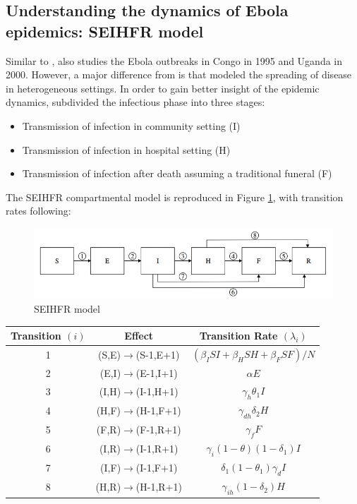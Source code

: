 \documentclass[10pt, journal,onecolumn]{IEEEtran}
\begin{document}
\subsection{\textbf{Understanding the dynamics of Ebola epidemics: SEIHFR model \citep{legrand2007understanding}}}

Similar to \citep{chowell2004basic}, \citep{legrand2007understanding} also studies the Ebola
outbreaks in Congo in 1995 and Uganda in 2000. However, a major difference from
\citep{chowell2004basic} is that \citep{legrand2007understanding} modeled the spreading of disease
in heterogeneous settings. In order to gain better insight of the epidemic dynamics,
\citep{legrand2007understanding} subdivided the infectious phase into three stages:

\begin{itemize}
\item Transmission of infection in community setting (I)
\item Transmission of infection in hospital setting (H)
\item Transmission of infection after death assuming a traditional funeral (F)
\end{itemize}


The SEIHFR compartmental model is reproduced in Figure \ref{fig:SEIHFR_model}, with transition rates
following:

\begin{figure}[h!]
\centering
\includegraphics[scale=0.5]{seihfr_model_fig}
\caption{SEIHFR model}
\label{fig:SEIHFR_model}
\end{figure}

\begin{center}
\begin{tabular}{|c|c|c|}
\hline 
Transition $(i)$ & Effect & Transition Rate $(\lambda_i)$ \tabularnewline
\hline 
\hline 
1 & (S,E)$\to$(S-1,E+1) & $(\beta_{I}SI+\beta_{H}SH+\beta_{F}SF)/N$\tabularnewline
\hline 
2 & (E,I)$\to$(E-1,I+1) & $\alpha E$\tabularnewline
\hline 
3 & (I,H)$\to$(I-1,H+1) & $\gamma_{h}\theta_{1}I$\tabularnewline
\hline 
4 & (H,F)$\to$(H-1,F+1) & $\gamma_{dh}\delta_{2}H$\tabularnewline
\hline 
5 & (F,R)$\to$(F-1,R+1) & $\gamma_{f}F$\tabularnewline
\hline 
6 & (I,R)$\to$(I-1,R+1) & $\gamma_{i}(1-\theta)(1-\delta_{1})I$\tabularnewline
\hline 
7 & (I,F)$\to$(I-1,F+1) & $\delta_{1}(1-\theta_{1})\gamma_{d}I$\tabularnewline
\hline 
8 & (H,R)$\to$(H-1,R+1) & $\gamma_{ih}(1-\delta_{2})H$\tabularnewline
\hline 
\end{tabular}
\end{center}
\end{document}
